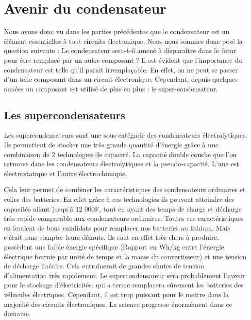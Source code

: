 \chapter{Avenir du condensateur}

Nous avons donc vu dans les parties précédentes que le condensateur est un élément essentielles à tout circuits électronique. Nous nous sommes donc posé la question suivante : Le condensateur sera-t-il amené à disparaître dans le futur pour être remplacé par un autre composant ?
Il est évident que l'importance du condensateur est telle qu'il parait irremplaçable. En effet, on ne peut se passer d'un telle composant dans un circuit électronique. Cependant, depuis quelques années un composant est utilisé de plus en plus : le super-condensateur. 

\section{Les supercondensateurs}

Les supercondensateurs sont une sous-catégorie des condensateurs électrolytiques. Ils permettent de stocker une très grande quantité d’énergie grâce à une combinaison de 2 technologies de capacité. La capacité double couche que l’on retrouve dans les condensateurs électrolytiques et la pseudo-capacité. L’une est électrostatique et l’autre électrochimique.

Cela leur permet de combiner les caractéristiques des condensateurs ordinaires et celles des batteries. En effet grâce à ces technologies ils peuvent atteindre des capacités allant jusqu’à 12 000F, tout en ayant des temps de charge et décharge très rapide comparable aux condensateurs ordinaires. Toutes ces caractéristiques en feraient de bons candidats pour remplacer nos batteries au lithium. Mais c’était sans compter leurs défauts. Ils sont en effet très chers à produire, possèdent une faible énergie spécifique (Rapport en Wh/kg entre l’énergie électrique fournie par unité de temps et la masse du convertisseur) et une tension de décharge linéaire. Cela entraînerait de grandes chutes de tension d’alimentation très rapidement.
Le supercondensateur sera probablement l'avenir pour le stockage d'électricités, qui a terme remplacera sûrement les batteries des véhicules électriques. Cependant, il est trop puissant pour le mettre dans la majorité des circuits électroniques. La science progresse énormément dans ce domaine.
